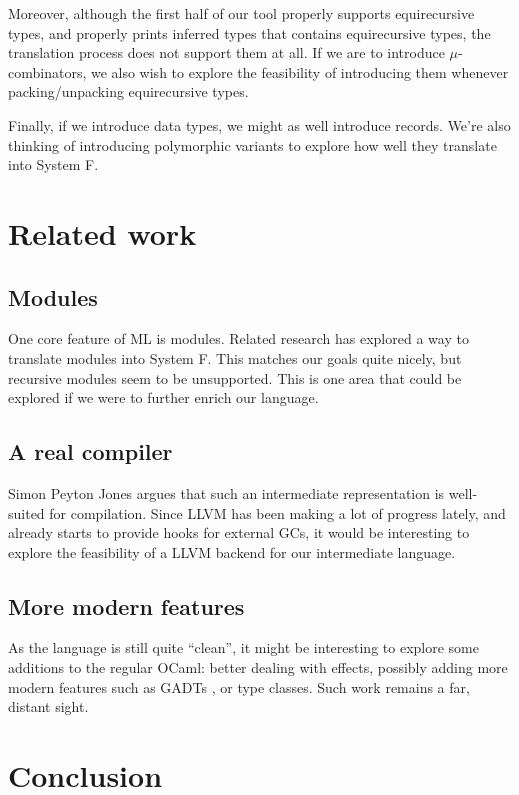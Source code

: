 \documentclass[10pt,a4paper,twoside,titlepage,twocolumn]{article}
\begin{document}
Moreover, although the first half of our tool properly supports equirecursive
types, and properly prints inferred types that contains equirecursive types, the
translation process does not support them at all. If we are to introduce
$\mu$-combinators, we also wish to explore the feasibility of introducing them
whenever packing/unpacking equirecursive types.

Finally, if we introduce data types, we might as well introduce records. We're
also thinking of introducing polymorphic variants to explore how well they
translate into System F.

\section{Related work}

\subsection{Modules}

One core feature of ML is modules. Related research \cite{rossberg2010f} has
explored a way to translate modules into System F. This matches our goals quite
nicely, but recursive modules seem to be unsupported. This is one area that
could be explored if we were to further enrich our language.

\subsection{A real compiler}

Simon Peyton Jones argues \cite{sulzmann2007system} that such an intermediate
representation is well-suited for compilation. Since LLVM \cite{llvm} has been
making a lot of progress lately, and already starts to provide hooks for
external GCs, it would be interesting to explore the feasibility of a LLVM
backend for our intermediate language.

\subsection{More modern features}

As the language is still quite ``clean'', it might be interesting to explore
some additions to the regular OCaml: better dealing with effects, possibly
adding more modern features such as GADTs \cite{simonet2004constraint}, or type
classes. Such work remains a far, distant sight.

\section{Conclusion}
\end{document}

